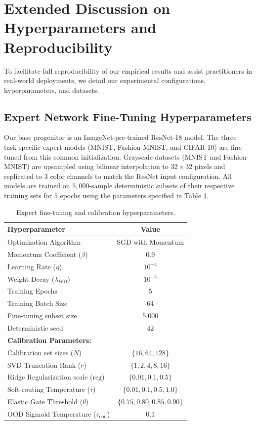 \documentclass{article}
\theoremstyle{plain}
\theoremstyle{definition}
\theoremstyle{remark}
\begin{document}
\section{Extended Discussion on Hyperparameters and Reproducibility}
\label{app:reproducibility}
To facilitate full reproducibility of our empirical results and assist practitioners in real-world deployments, we detail our experimental configurations, hyperparameters, and datasets.

\subsection{Expert Network Fine-Tuning Hyperparameters}
Our base progenitor is an ImageNet-pre-trained ResNet-18 model. The three task-specific expert models (MNIST, Fashion-MNIST, and CIFAR-10) are fine-tuned from this common initialization. Grayscale datasets (MNIST and Fashion-MNIST) are upsampled using bilinear interpolation to $32 \times 32$ pixels and replicated to $3$ color channels to match the ResNet input configuration. All models are trained on $5,000$-sample deterministic subsets of their respective training sets for $5$ epochs using the parameters specified in Table \ref{tab:hyperparams}.

\begin{table}[H]
\caption{Expert fine-tuning and calibration hyperparameters.}
\label{tab:hyperparams}
\vskip 0.15in
\begin{center}
\begin{small}
\begin{sc}
\begin{tabular}{lc}
\toprule
Hyperparameter & Value \\
\midrule
Optimization Algorithm & SGD with Momentum \\
Momentum Coefficient ($\beta$) & 0.9 \\
Learning Rate ($\eta$) & $10^{-4}$ \\
Weight Decay ($\lambda_{\text{WD}}$) & $10^{-4}$ \\
Training Epochs & 5 \\
Training Batch Size & 64 \\
Fine-tuning subset size & 5,000 \\
Deterministic seed & 42 \\
\midrule
\textbf{Calibration Parameters:} \\
Calibration set sizes ($N$) & $\{16, 64, 128\}$ \\
SVD Truncation Rank ($r$) & $\{1, 2, 4, 8, 16\}$ \\
Ridge Regularization scale ($\text{reg}$) & $\{0.01, 0.1, 0.5\}$ \\
Soft-routing Temperature ($\tau$) & $\{0.01, 0.1, 0.5, 1.0\}$ \\
Elastic Gate Threshold ($\theta$) & $\{0.75, 0.80, 0.85, 0.90\}$ \\
OOD Sigmoid Temperature ($\tau_{\text{ood}}$) & 0.1 \\
\bottomrule
\end{tabular}
\end{sc}
\end{small}
\end{center}
\vskip -0.1in
\end{table}
\end{document}
